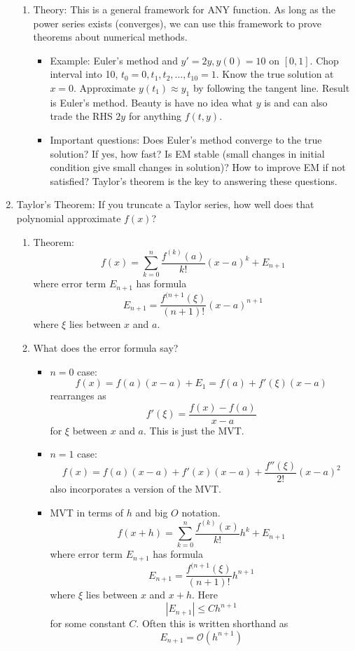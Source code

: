 \documentclass{article}
\theoremstyle{remark}
\begin{document}
\begin{enumerate}
\begin{enumerate}
\item Theory: This is a general framework for ANY function. As long as the power series exists (converges), we can use this framework to prove theorems about numerical methods.
\begin{itemize}
\item Example: Euler's method and $y' = 2y, y(0)=10$ on $[0,1]$. Chop interval into 10, $t_0=0, t_1, t_2, \dots, t_{10}=1$. Know the true solution at $x=0$. Approximate $y(t_1)\approx y_1$ by following the tangent line. Result is Euler's method. Beauty is have no idea what $y$ is and can also trade the RHS $2y$ for anything $f(t,y)$.
\item Important questions: Does Euler's method converge to the true solution? If yes, how fast? Is EM stable (small changes in initial condition give small changes in solution)? How to improve EM if not satisfied? Taylor's theorem is the key to answering these questions.
\end{itemize}
\end{enumerate}

\item Taylor's Theorem: If you truncate a Taylor series, how well does that polynomial approximate $f(x)$?
\begin{enumerate}
\item Theorem:
\[
f(x) = \sum_{k=0}^n \frac{f^(k)(a)}{k!}(x-a)^k + E_{n+1}
\]
where error term $E_{n+1}$ has formula
\[
E_{n+1} = \frac{f^{(n+1}(\xi)}{(n+1)!} (x-a)^{n+1}
\]
where $\xi$ lies between $x$ and $a$.
\item What does the error formula say?
\begin{itemize}
\item $n=0$ case: 
\[
f(x) = f(a)(x-a) + E_{1} = f(a) + f'(\xi)(x-a)
\]
rearranges as
\[
f'(\xi) = \frac{f(x)-f(a)}{x-a}
\]
for $\xi$ between $x$ and $a$. This is just the MVT.
\item $n=1$ case: 
\[
f(x) = f(a)(x-a) + f'(x)(x-a) + \frac{f''(\xi)}{2!} (x-a)^2
\]
also incorporates a version of the MVT.
\item MVT in terms of $h$ and big $O$ notation.
\[
f(x+h) = \sum_{k=0}^n \frac{f^(k)(x)}{k!}h^k + E_{n+1}
\]
where error term $E_{n+1}$ has formula
\[
E_{n+1} = \frac{f^{(n+1}(\xi)}{(n+1)!} h^{n+1}
\]
where $\xi$ lies between $x$ and $x+h$. Here 
\[
| E_{n+1} | \leq C h^{n+1}
\]
for some constant $C$. Often this is written shorthand as
\[
E_{n+1} = \mathcal{O}(h^{n+1})
\]
\end{itemize}


\end{enumerate}
\end{enumerate}
\end{document}

